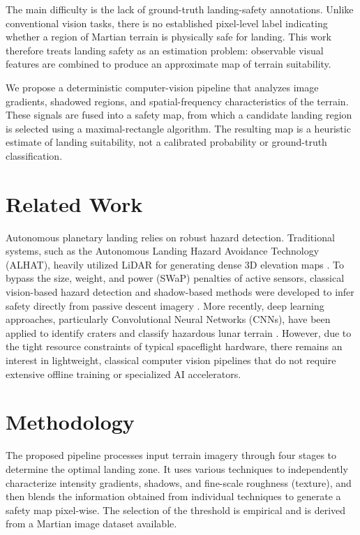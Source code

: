 \documentclass{article}
\begin{document}
The main difficulty is the lack of ground-truth landing-safety annotations. Unlike conventional vision tasks, there is no established pixel-level label indicating whether a region of Martian terrain is physically safe for landing. This work therefore treats landing safety as an estimation problem: observable visual features are combined to produce an approximate map of terrain suitability.

We propose a deterministic computer-vision pipeline that analyzes image gradients, shadowed regions, and spatial-frequency characteristics of the terrain. These signals are fused into a safety map, from which a candidate landing region is selected using a maximal-rectangle algorithm. The resulting map is a heuristic estimate of landing suitability, not a calibrated probability or ground-truth classification.

\section{Related Work}
Autonomous planetary landing relies on robust hazard detection. Traditional systems, such as the Autonomous Landing Hazard Avoidance Technology (ALHAT), heavily utilized LiDAR for generating dense 3D elevation maps \cite{amzajerdian2013alhat}. To bypass the size, weight, and power (SWaP) penalties of active sensors, classical vision-based hazard detection and shadow-based methods were developed to infer safety directly from passive descent imagery \cite{restrepo2020next}. More recently, deep learning approaches, particularly Convolutional Neural Networks (CNNs), have been applied to identify craters and classify hazardous lunar terrain \cite{moghe2020deep}. However, due to the tight resource constraints of typical spaceflight hardware, there remains an interest in lightweight, classical computer vision pipelines that do not require extensive offline training or specialized AI accelerators.

\section{Methodology}
\label{sec:headings}
The proposed pipeline processes input terrain imagery through four stages to determine the optimal landing zone. It uses various techniques to independently characterize intensity gradients, shadows, and fine-scale roughness (texture), and then blends the information obtained from
individual techniques to generate a safety map pixel-wise. The
selection of the threshold is empirical and is derived from a
Martian image dataset available.
\end{document}
